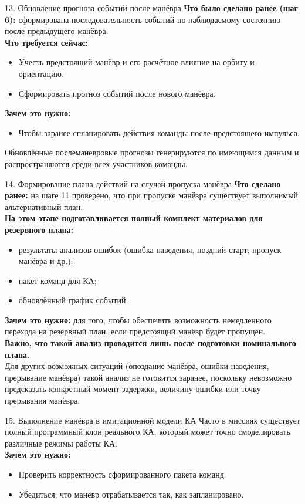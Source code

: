 \documentclass[8pt]{beamer}
\begin{document}
\begin{frame}{13. Обновление прогноза событий после манёвра}
\textbf{Что было сделано ранее (шаг 6):} сформирована последовательность событий по наблюдаемому состоянию после предыдущего манёвра. \\
\smallskip
\textbf{Что требуется сейчас:} 
\begin{itemize}
    \item Учесть предстоящий манёвр и его расчётное влияние на орбиту и ориентацию.
    \item Сформировать прогноз событий после нового манёвра.
\end{itemize}
\textbf{Зачем это нужно:}
\begin{itemize}
    \item Чтобы заранее спланировать действия команды после предстоящего импульса.
\end{itemize}
Обновлённые послеманевровые прогнозы генерируются по имеющимся данным и распространяются среди всех участников команды.
\end{frame}

\begin{frame}{14. Формирование плана действий на случай пропуска манёвра}
\textbf{Что сделано ранее:} на шаге 11 проверено, что при пропуске манёвра существует выполнимый альтернативный план. \\
\smallskip
\textbf{На этом этапе подготавливается полный комплект материалов для резервного плана:}
\begin{itemize}
    \item результаты анализов ошибок (ошибка наведения, поздний старт, пропуск манёвра и др.);
    \item пакет команд для КА;
    \item обновлённый график событий.
\end{itemize}
\textbf{Зачем это нужно:} для того, чтобы обеспечить возможность немедленного перехода на резервный план, если предстоящий манёвр будет пропущен. \\
\smallskip
\textbf{Важно, что такой анализ проводится лишь после подготовки номинального плана.} \\
\smallskip 
Для других возможных ситуаций (опоздание манёвра, ошибки наведения, прерывание манёвра) такой анализ не готовится заранее, поскольку невозможно предсказать конкретный момент задержки, величину ошибки или точку прерывания манёвра.
\end{frame}

\begin{frame}{15. Выполнение манёвра в имитационной модели КА}
Часто в миссиях существует полный программный клон реального КА, который может точно смоделировать различные режимы работы КА. \\
\smallskip
\textbf{Зачем это нужно:}
\begin{itemize}
    \item Проверить корректность сформированного пакета команд.
    \item Убедиться, что манёвр отрабатывается так, как запланировано.
\end{itemize}
\end{frame}
\end{document}
